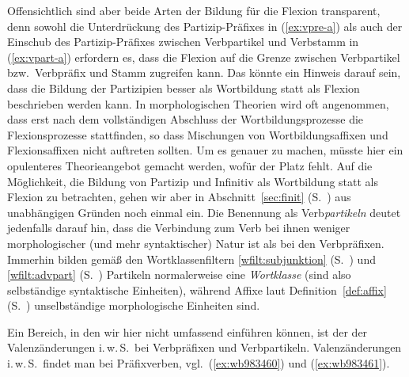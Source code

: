 \begin{exe}
\end{exe}

\label{abs:praefixundflex}Offensichtlich sind aber beide Arten der Bildung für die Flexion transparent, denn sowohl die Unterdrückung des Partizip-Präfixes in (\ref{ex:vpre-a}) als auch der Einschub des Partizip-Präfixes zwischen Verbpartikel und Verbstamm in (\ref{ex:vpart-a}) erfordern es, dass die Flexion auf die Grenze zwischen Verbpartikel bzw.\ Verbpräfix und Stamm zugreifen kann.
Das könnte ein Hinweis darauf sein, dass die Bildung der Partizipien besser als Wortbildung statt als Flexion beschrieben werden kann.
In morphologischen Theorien wird oft angenommen, dass erst nach dem vollständigen Abschluss der Wortbildungsprozesse die Flexionsprozesse stattfinden, so dass Mischungen von Wortbildungsaffixen und Flexionsaffixen nicht auftreten sollten.
Um es genauer zu machen, müsste hier ein opulenteres Theorieangebot gemacht werden, wofür der Platz fehlt.
Auf die Möglichkeit, die Bildung von Partizip und Infinitiv als Wortbildung statt als Flexion zu betrachten, gehen wir aber in Abschnitt~\ref{sec:finit} (S.~\pageref{abs:infinwortbild}) aus unabhängigen Gründen noch einmal ein.
Die Benennung als Verb\textit{partikeln} deutet jedenfalls darauf hin, dass die Verbindung zum Verb bei ihnen weniger morphologischer (und mehr syntaktischer) Natur ist als bei den Verbpräfixen.
Immerhin bilden gemäß den Wortklassenfiltern \ref{wfilt:subjunktion} (S.~\pageref{wfilt:subjunktion}) und \ref{wfilt:advpart} (S.~\pageref{wfilt:advpart}) Partikeln normalerweise eine \textit{Wortklasse} (sind also selbständige syntaktische Einheiten), während Affixe laut Definition~\ref{def:affix} (S.~\pageref{def:affix}) unselbständige morphologische Einheiten sind.

Ein Bereich, in den wir hier nicht umfassend einführen können, ist der der Valenzänderungen i.\,w.\,S.\ bei Verbpräfixen und Verbpartikeln.
Valenzänderungen i.\,w.\,S.\ findet man bei Präfixverben, vgl.\ (\ref{ex:wb983460}) und (\ref{ex:wb983461}).


